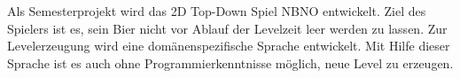 Als Semesterprojekt wird das 2D Top-Down Spiel NBNO entwickelt.
Ziel des Spielers ist es, sein Bier nicht vor Ablauf der Levelzeit leer werden zu lassen.
Zur Levelerzeugung wird eine domänenspezifische Sprache entwickelt. Mit Hilfe dieser Sprache ist es auch ohne Programmierkenntnisse möglich, neue Level zu erzeugen.